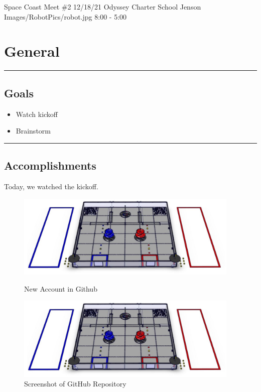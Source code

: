 \insertmeeting 
	{Space Coast Meet \#2} 
	{12/18/21}
	{Odyssey Charter School}
	{Jenson}
	{Images/RobotPics/robot.jpg}
	{8:00 - 5:00}
	
\section*{General}
\noindent\hfil\rule{\textwidth}{.4pt}\hfil
\subsection*{Goals}
\begin{itemize}
    \item Watch kickoff
    \item Brainstorm   

\end{itemize} 

\noindent\hfil\rule{\textwidth}{.4pt}\hfil

\subsection*{Accomplishments}
Today, we watched the kickoff.
 

\begin{figure}[ht]
\centering
\begin{minipage}[b]{.48\textwidth}
  \centering
  \includegraphics[width=0.95\textwidth]{Meetings/September/09-18-21/field.png}
  \caption{New Account in Github}
  \label{fig:pic1}
\end{minipage}%
\hfill%
\begin{minipage}[b]{.48\textwidth}
  \centering
  \includegraphics[width=0.95\textwidth]{Meetings/September/09-18-21/field.png}
  \caption{Screenshot of GitHub Repository}
  \label{fig:pic2}
\end{minipage}
\end{figure}







